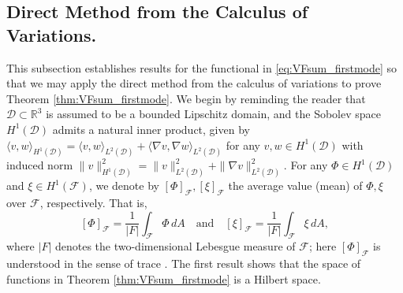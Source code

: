 \documentclass[letterpaper, 12pt]{amsart}
\newcommand{\R}{\mathbb{R}}
\newcommand{\D}{\mathcal{D}}
\newcommand{\F}{\mathcal{F}}
\begin{document}
\subsection{Direct Method from the Calculus of Variations.} \label{sec:Prelim_CoV}
This subsection establishes results for the functional in \eqref{eq:VFsum_firstmode} so that we may apply the direct method from the calculus of variations \cite{Dacorogna:2007aa, Evans:2010aa} to prove Theorem \ref{thm:VFsum_firstmode}. We begin by reminding the reader that $\D\subset\R^3$ is assumed to be a bounded Lipschitz domain, and the Sobolev space $H^1(\D)$ admits a natural inner product, given by
$ \langle v,w\rangle_{H^1(\D)} = \langle v,w\rangle_{L^2(\D)} + \langle\nabla v, \nabla w\rangle_{L^2(\D)}$  for any $v, w\in H^1(\D)$
with  induced norm
$ \|v\|_{H^1(\D)}^2 = \|v\|_{L^2(\D)}^2 + \|\nabla v\|_{L^2(\D)}^2$. 
 For any $\Phi\in H^1(\D)$ and $\xi\in H^1(\F)$, we denote by $[\Phi]_\F, [\xi]_\F$ the average value (mean) of $\Phi,\xi$ over $\F$, respectively. That is,
\[ [\Phi]_\F = \frac{1}{|F|}\int_\F \Phi\, dA  \quad  \textrm{and} \quad [\xi]_\F = \frac{1}{|F|}\int_\F \xi\, dA, \]
where $|F|$ denotes the two-dimensional Lebesgue measure of $\F$; here $[\Phi]_\F$ is understood in the sense of trace \cite[Chapter 5.5]{Evans:2010aa}. The first result shows that the space of functions in Theorem \ref{thm:VFsum_firstmode} is a Hilbert space. 
\end{document}
